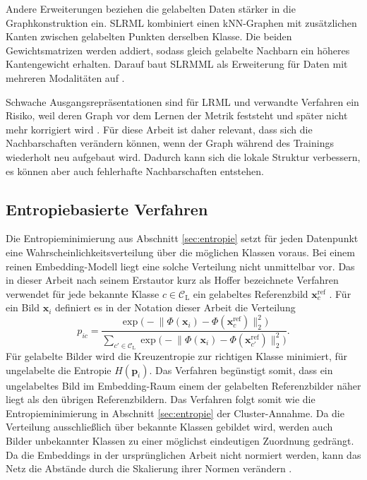 Andere Erweiterungen beziehen die gelabelten Daten stärker in die Graphkonstruktion ein. \ac{SLRML} kombiniert einen \ac{kNN}-Graphen mit zusätzlichen Kanten zwischen gelabelten Punkten derselben Klasse. Die beiden Gewichtsmatrizen werden addiert, sodass gleich gelabelte Nachbarn ein höheres Kantengewicht erhalten. Darauf baut \ac{SLRMML} als Erweiterung für Daten mit mehreren Modalitäten auf \cite{liang_semisupervised_2022}.

Schwache Ausgangsrepräsentationen sind für \ac{LRML} und verwandte Verfahren ein Risiko, weil deren Graph vor dem Lernen der Metrik feststeht und später nicht mehr korrigiert wird \cite{dutta_semi-supervised_2021}. Für diese Arbeit ist daher relevant, dass sich die Nachbarschaften verändern können, wenn der Graph während des Trainings wiederholt neu aufgebaut wird. Dadurch kann sich die lokale Struktur verbessern, es können aber auch fehlerhafte Nachbarschaften entstehen.

\subsection{Entropiebasierte Verfahren}
\label{sec:hoffer}

Die Entropieminimierung aus Abschnitt \ref{sec:entropie} setzt für jeden Datenpunkt eine Wahrscheinlichkeitsverteilung über die möglichen Klassen voraus. Bei einem reinen Embedding-Modell liegt eine solche Verteilung nicht unmittelbar vor. Das in dieser Arbeit nach seinem Erstautor kurz als Hoffer bezeichnete Verfahren verwendet für jede bekannte Klasse $c\in\mathcal{C}_{\mathrm{L}}$ ein gelabeltes Referenzbild $\bm{x}^{\mathrm{ref}}_c$ \cite{hoffer_semi-supervised_2018}. Für ein Bild $\bm{x}_i$ definiert es in der Notation dieser Arbeit die Verteilung \cite{hoffer_semi-supervised_2018}
\begin{equation}
  p_{ic}=\frac{\exp\bigl(-\lVert\Phi(\bm{x}_i)-\Phi(\bm{x}^{\mathrm{ref}}_c)\rVert_2^2\bigr)}{\sum_{c'\in\mathcal{C}_{\mathrm{L}}}\exp\bigl(-\lVert\Phi(\bm{x}_i)-\Phi(\bm{x}^{\mathrm{ref}}_{c'})\rVert_2^2\bigr)}.
  \label{eq:hoffer}
\end{equation}
Für gelabelte Bilder wird die Kreuzentropie zur richtigen Klasse minimiert, für ungelabelte die Entropie $H(\bm{p}_i)$. Das Verfahren begünstigt somit, dass ein ungelabeltes Bild im Embedding-Raum einem der gelabelten Referenzbilder näher liegt als den übrigen Referenzbildern. Das Verfahren folgt somit wie die Entropieminimierung in Abschnitt \ref{sec:entropie} der Cluster-Annahme. Da die Verteilung ausschließlich über bekannte Klassen gebildet wird, werden auch Bilder unbekannter Klassen zu einer möglichst eindeutigen Zuordnung gedrängt. Da die Embeddings in der ursprünglichen Arbeit nicht normiert werden, kann das Netz die Abstände durch die Skalierung ihrer Normen verändern \cite{hoffer_semi-supervised_2018}.

